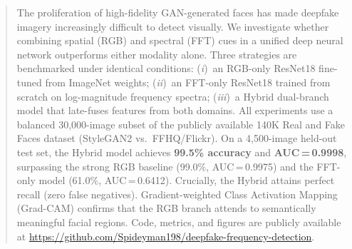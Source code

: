 \begin{abstract}
The proliferation of high-fidelity GAN-generated faces has made deepfake
imagery increasingly difficult to detect visually.
We investigate whether combining spatial (RGB) and spectral (FFT) cues in a
unified deep neural network outperforms either modality alone.
Three strategies are benchmarked under identical conditions:
(\emph{i})~an RGB-only ResNet18 fine-tuned from ImageNet weights;
(\emph{ii})~an FFT-only ResNet18 trained from scratch on log-magnitude
frequency spectra;
(\emph{iii})~a Hybrid dual-branch model that late-fuses features from both
domains.
All experiments use a balanced 30{,}000-image subset of the publicly
available 140K Real and Fake Faces dataset (StyleGAN2 vs.\ FFHQ/Flickr).
On a 4{,}500-image held-out test set, the Hybrid model achieves
\textbf{99.5\% accuracy} and \textbf{AUC\,=\,0.9998}, surpassing the
strong RGB baseline (99.0\%, AUC\,=\,0.9975) and the FFT-only model
(61.0\%, AUC\,=\,0.6412).
Crucially, the Hybrid attains perfect recall (zero false negatives).
Gradient-weighted Class Activation Mapping (Grad-CAM) confirms that the RGB
branch attends to semantically meaningful facial regions.
Code, metrics, and figures are publicly available at \url{https://github.com/Spideyman198/deepfake-frequency-detection}.
\end{abstract}
